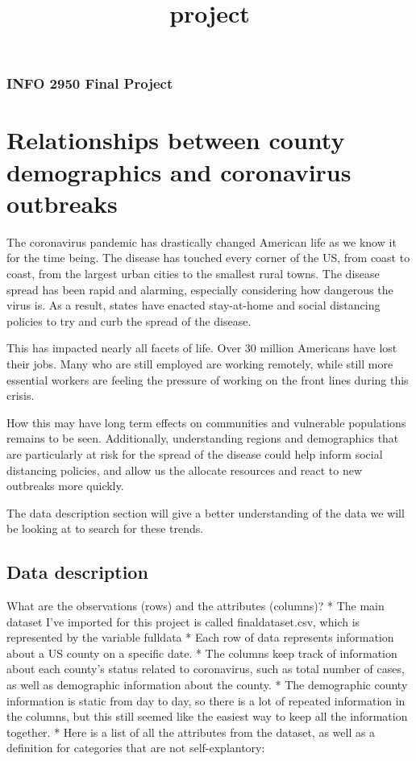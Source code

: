 \documentclass[11pt]{article}
\title{project}
\begin{document}
    
    
    \maketitle
    
    

    
    \subsubsection{\texorpdfstring{\textbf{INFO 2950 Final
Project}}{INFO 2950 Final Project}}\label{info-2950-final-project}

    \section{Relationships between county demographics and coronavirus
outbreaks}\label{relationships-between-county-demographics-and-coronavirus-outbreaks}

    The coronavirus pandemic has drastically changed American life as we
know it for the time being. The disease has touched every corner of the
US, from coast to coast, from the largest urban cities to the smallest
rural towns. The disease spread has been rapid and alarming, especially
considering how dangerous the virus is. As a result, states have enacted
stay-at-home and social distancing policies to try and curb the spread
of the disease.

This has impacted nearly all facets of life. Over 30 million Americans
have lost their jobs. Many who are still employed are working remotely,
while still more essential workers are feeling the pressure of working
on the front lines during this crisis.

How this may have long term effects on communities and vulnerable
populations remains to be seen. Additionally, understanding regions and
demographics that are particularly at risk for the spread of the disease
could help inform social distancing policies, and allow us the allocate
resources and react to new outbreaks more quickly.

The data description section will give a better understanding of the
data we will be looking at to search for these trends.

    \subsection{Data description}\label{data-description}

What are the observations (rows) and the attributes (columns)? * The
main dataset I've imported for this project is called finaldataset.csv,
which is represented by the variable fulldata * Each row of data
represents information about a US county on a specific date. * The
columns keep track of information about each county's status related to
coronavirus, such as total number of cases, as well as demographic
information about the county. * The demographic county information is
static from day to day, so there is a lot of repeated information in the
columns, but this still seemed like the easiest way to keep all the
information together. * Here is a list of all the attributes from the
dataset, as well as a definition for categories that are not
self-explantory:
\end{document}

